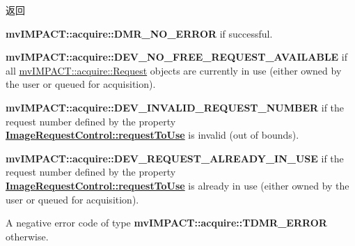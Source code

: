 \begin{DoxyReturn}{返回}

\begin{DoxyItemize}
\item {\bfseries mv\+I\+M\+P\+A\+C\+T\+::acquire\+::\+D\+M\+R\+\_\+\+N\+O\+\_\+\+E\+R\+R\+O\+R} if successful.
\item {\bfseries mv\+I\+M\+P\+A\+C\+T\+::acquire\+::\+D\+E\+V\+\_\+\+N\+O\+\_\+\+F\+R\+E\+E\+\_\+\+R\+E\+Q\+U\+E\+S\+T\+\_\+\+A\+V\+A\+I\+L\+A\+B\+L\+E} if all \hyperlink{classmv_i_m_p_a_c_t_1_1acquire_1_1_request}{mv\+I\+M\+P\+A\+C\+T\+::acquire\+::\+Request} objects are currently in use (either owned by the user or queued for acquisition).
\item {\bfseries mv\+I\+M\+P\+A\+C\+T\+::acquire\+::\+D\+E\+V\+\_\+\+I\+N\+V\+A\+L\+I\+D\+\_\+\+R\+E\+Q\+U\+E\+S\+T\+\_\+\+N\+U\+M\+B\+E\+R} if the request number defined by the property {\bfseries \hyperlink{classmv_i_m_p_a_c_t_1_1acquire_1_1_image_request_control_acb01d358421ecad7b28f3de692c4868d}{Image\+Request\+Control\+::request\+To\+Use}} is invalid (out of bounds).
\item {\bfseries mv\+I\+M\+P\+A\+C\+T\+::acquire\+::\+D\+E\+V\+\_\+\+R\+E\+Q\+U\+E\+S\+T\+\_\+\+A\+L\+R\+E\+A\+D\+Y\+\_\+\+I\+N\+\_\+\+U\+S\+E} if the request number defined by the property {\bfseries \hyperlink{classmv_i_m_p_a_c_t_1_1acquire_1_1_image_request_control_acb01d358421ecad7b28f3de692c4868d}{Image\+Request\+Control\+::request\+To\+Use}} is already in use (either owned by the user or queued for acquisition).
\item A negative error code of type {\bfseries mv\+I\+M\+P\+A\+C\+T\+::acquire\+::\+T\+D\+M\+R\+\_\+\+E\+R\+R\+O\+R} otherwise. 
\end{DoxyItemize}
\end{DoxyReturn}

